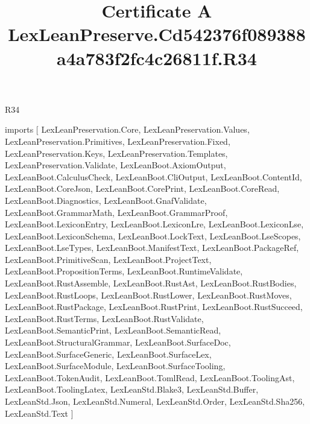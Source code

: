 \begin{lexlean}{R34}
\title{Certificate A LexLeanPreserve.Cd542376f089388a4a783f2fc4c26811f.R34}
\begin{coremodule}
imports [
  LexLeanPreservation.Core,
  LexLeanPreservation.Values,
  LexLeanPreservation.Primitives,
  LexLeanPreservation.Fixed,
  LexLeanPreservation.Keys,
  LexLeanPreservation.Templates,
  LexLeanPreservation.Validate,
  LexLeanBoot.AxiomOutput,
  LexLeanBoot.CalculusCheck,
  LexLeanBoot.CliOutput,
  LexLeanBoot.ContentId,
  LexLeanBoot.CoreJson,
  LexLeanBoot.CorePrint,
  LexLeanBoot.CoreRead,
  LexLeanBoot.Diagnostics,
  LexLeanBoot.GnafValidate,
  LexLeanBoot.GrammarMath,
  LexLeanBoot.GrammarProof,
  LexLeanBoot.LexiconEntry,
  LexLeanBoot.LexiconLre,
  LexLeanBoot.LexiconLse,
  LexLeanBoot.LexiconSchema,
  LexLeanBoot.LockText,
  LexLeanBoot.LseScopes,
  LexLeanBoot.LseTypes,
  LexLeanBoot.ManifestText,
  LexLeanBoot.PackageRef,
  LexLeanBoot.PrimitiveScan,
  LexLeanBoot.ProjectText,
  LexLeanBoot.PropositionTerms,
  LexLeanBoot.RuntimeValidate,
  LexLeanBoot.RustAssemble,
  LexLeanBoot.RustAst,
  LexLeanBoot.RustBodies,
  LexLeanBoot.RustLoops,
  LexLeanBoot.RustLower,
  LexLeanBoot.RustMoves,
  LexLeanBoot.RustPackage,
  LexLeanBoot.RustPrint,
  LexLeanBoot.RustSucceed,
  LexLeanBoot.RustTerms,
  LexLeanBoot.RustValidate,
  LexLeanBoot.SemanticPrint,
  LexLeanBoot.SemanticRead,
  LexLeanBoot.StructuralGrammar,
  LexLeanBoot.SurfaceDoc,
  LexLeanBoot.SurfaceGeneric,
  LexLeanBoot.SurfaceLex,
  LexLeanBoot.SurfaceModule,
  LexLeanBoot.SurfaceTooling,
  LexLeanBoot.TokenAudit,
  LexLeanBoot.TomlRead,
  LexLeanBoot.ToolingAst,
  LexLeanBoot.ToolingLatex,
  LexLeanStd.Blake3,
  LexLeanStd.Buffer,
  LexLeanStd.Json,
  LexLeanStd.Numeral,
  LexLeanStd.Order,
  LexLeanStd.Sha256,
  LexLeanStd.Text
]


\end{coremodule}
\end{lexlean}
